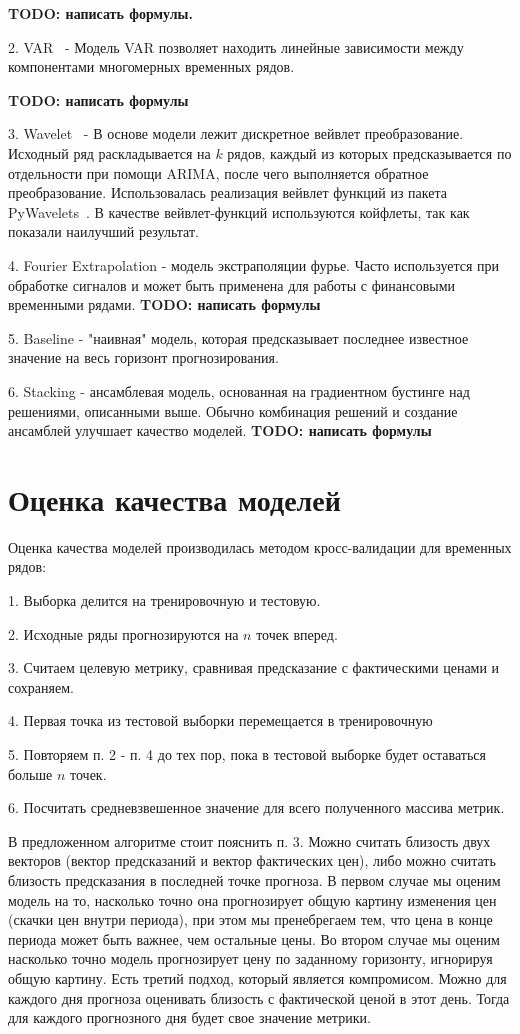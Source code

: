 \documentclass[a4paper,article,14pt]{extarticle}
\begin{document}
\textbf{TODO: написать формулы.}

2.
VAR~\cite{var} - Модель VAR позволяет находить линейные зависимости между компонентами многомерных временных рядов.

\textbf{TODO: написать формулы}

3.
Wavelet~\cite{wavelet} - В основе модели лежит дискретное вейвлет преобразование.
Исходный ряд раскладывается на $k$ рядов, каждый из которых предсказывается по отдельности при помощи ARIMA, после чего выполняется обратное преобразование.
Использовалась реализация вейвлет функций из пакета PyWavelets~\cite{pywt}.
В качестве вейвлет-функций используются койфлеты, так как показали наилучший результат.

4.
Fourier Extrapolation - модель экстраполяции фурье.
Часто используется при обработке сигналов и может быть применена для работы с финансовыми временными рядами.
\textbf{TODO: написать формулы}

5.
Baseline - "наивная" модель, которая предсказывает последнее известное значение на весь горизонт прогнозирования.

6.
Stacking - ансамблевая модель, основанная на градиентном бустинге над решениями, описанными выше.
Обычно комбинация решений и создание ансамблей улучшает качество моделей.
\textbf{TODO: написать формулы}

\section{Оценка качества моделей}

Оценка качества моделей производилась методом кросс-валидации для временных рядов:

1.
Выборка делится на тренировочную и тестовую.

2.
Исходные ряды прогнозируются на $n$ точек вперед.

3.
Считаем целевую метрику, сравнивая предсказание с фактическими ценами и сохраняем.

4.
Первая точка из тестовой выборки перемещается в тренировочную

5.
Повторяем п. 2 - п. 4 до тех пор, пока в тестовой выборке будет оставаться больше $n$ точек.

6.
Посчитать средневзвешенное значение для всего полученного массива метрик.

В предложенном алгоритме стоит пояснить п. 3.
Можно считать близость двух векторов (вектор предсказаний и вектор фактических цен), либо можно считать близость предсказания в последней точке прогноза.
В первом случае мы оценим модель на то, насколько точно она прогнозирует общую картину изменения цен (скачки цен внутри периода), при этом мы пренебрегаем тем, что цена в конце периода может быть важнее, чем остальные цены.
Во втором случае мы оценим насколько точно модель прогнозирует цену по заданному горизонту, игнорируя общую картину.
Есть третий подход, который является компромисом.
Можно для каждого дня прогноза оценивать близость с фактической ценой в этот день.
Тогда для каждого прогнозного дня будет свое значение метрики.
\end{document}
